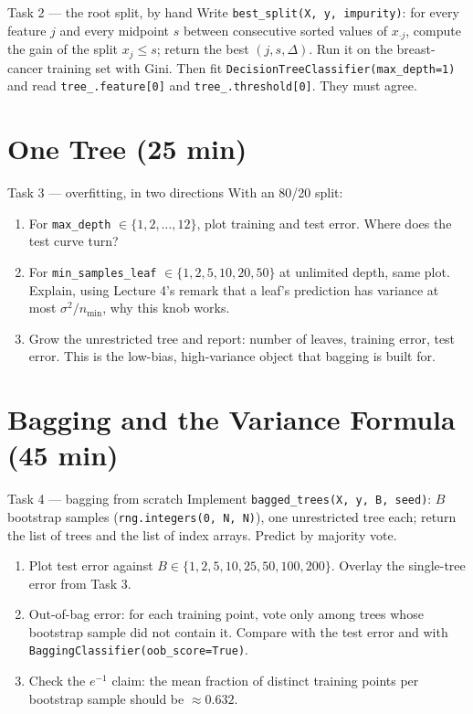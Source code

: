 \documentclass[11pt]{article}
\begin{document}
\begin{task}{Task 2 --- the root split, by hand}
Write \texttt{best\_split(X, y, impurity)}: for every feature $j$ and every midpoint $s$ between consecutive
sorted values of $x_{\cdot j}$, compute the gain of the split $x_j\le s$; return the best $(j,s,\Delta)$.
Run it on the breast-cancer training set with Gini. Then fit \texttt{DecisionTreeClassifier(max\_depth=1)}
and read \texttt{tree\_.feature[0]} and \texttt{tree\_.threshold[0]}. They must agree.
\end{task}

\section{One Tree (25 min)}

\begin{task}{Task 3 --- overfitting, in two directions}
With an 80/20 split:
\begin{enumerate}[nosep]
  \item For \texttt{max\_depth} $\in\{1,2,\dots,12\}$, plot training and test error. Where does the test curve turn?
  \item For \texttt{min\_samples\_leaf} $\in\{1,2,5,10,20,50\}$ at unlimited depth, same plot. Explain, using
        Lecture 4's remark that a leaf's prediction has variance at most $\sigma^2/n_{\min}$, why this knob
        works.
  \item Grow the unrestricted tree and report: number of leaves, training error, test error. This is the
        low-bias, high-variance object that bagging is built for.
\end{enumerate}
\end{task}

\section{Bagging and the Variance Formula (45 min)}

\begin{task}{Task 4 --- bagging from scratch}
Implement \texttt{bagged\_trees(X, y, B, seed)}: $B$ bootstrap samples (\texttt{rng.integers(0, N, N)}),
one unrestricted tree each; return the list of trees and the list of index arrays. Predict by majority vote.
\begin{enumerate}[nosep]
  \item Plot test error against $B\in\{1,2,5,10,25,50,100,200\}$. Overlay the single-tree error from Task 3.
  \item Out-of-bag error: for each training point, vote only among trees whose bootstrap sample did not
        contain it. Compare with the test error and with \texttt{BaggingClassifier(oob\_score=True)}.
  \item Check the $e^{-1}$ claim: the mean fraction of distinct training points per bootstrap sample should be
        $\approx0.632$.
\end{enumerate}
\end{task}
\end{document}
